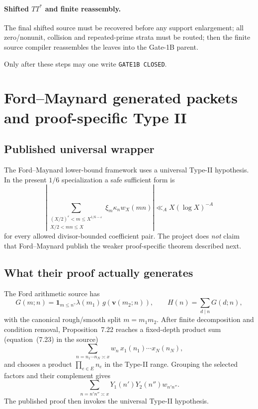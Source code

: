 \documentclass[11pt]{article}
\theoremstyle{definition}
\newcommand{\1}{\mathbf 1}
\begin{document}
\paragraph{Shifted $TT^\ast$ and finite reassembly.}
The final shifted source must be recovered before any support enlargement; all zero/nonunit,
collision and repeated-prime strata must be routed; then the finite source compiler
reassembles the leaves into the Gate-1B parent.

Only after these steps may one write \texttt{GATE1B CLOSED}.

\section{Ford--Maynard generated packets and proof-specific Type II}
\label{sec:ford-theory}

\subsection{Published universal wrapper}

The Ford--Maynard lower-bound framework uses a universal Type-II hypothesis.  In the
present $1/6$ specialization a safe sufficient form is
\[
\boxed{
\left|
\sum_{\substack{(X/2)^{\varepsilon}<m\le X^{1/6-\varepsilon}\\X/2<mn\le X}}
\xi_m\kappa_n w_X(mn)
\right|
\ll_A X(\log X)^{-A}
}
\tag{FM-universal-II}
\]
for every allowed divisor-bounded coefficient pair.  The project does \emph{not} claim
that Ford--Maynard publish the weaker proof-specific theorem described next.

\subsection{What their proof actually generates}

The Ford arithmetic source has
\[
G(m;n)
=
\mathbf 1_{m\le n^\gamma}\lambda(m_1)\,
g(\mathbf v(m_2;n)),
\qquad
\boxed{H(n)=\sum_{d\mid n}G(d;n),}
\tag{FM-GH}
\]
with the canonical rough/smooth split $m=m_1m_2$.
After finite decomposition and condition removal, Proposition~7.22 reaches a fixed-depth
product sum (equation~(7.23) in the source)
\[
\sum_{n=n_1\cdots n_N\asymp x}
w_n\,x_1(n_1)\cdots x_N(n_N),
\tag{FM-7.23}
\]
and chooses a product $\prod_{e\in E}n_e$ in the Type-II range.
Grouping the selected factors and their complement gives
\[
\boxed{
\sum_{n=n'n''\asymp x}
Y_1(n')Y_2(n'')w_{n'n''}.
}
\tag{FM-generated-II}
\]
The published proof then invokes the universal Type-II hypothesis.
\end{document}
